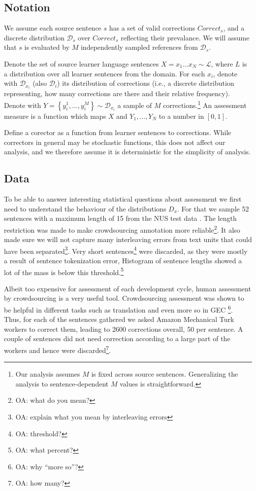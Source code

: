 \documentclass[english]{article}
\newcommand{\oa}[1]{\footnote{\color{red}OA: #1}}
\begin{document}
\subsection{Notation}

We assume each source sentence $s$ has a set of valid corrections $Correct_s$,
and a discrete distribution $\mathcal{D}_s$ over $Correct_s$ reflecting their prevalance.
We will assume that $s$ is evaluated by
$M$ independently sampled references from $\mathcal{D}_s$.

Denote the set of source learner language sentences $X=x_{1}\ldots x_N \sim \mathcal{L}$, where
$L$ is a distribution over all learner sentences from the domain. For each $x_i$, denote
with $\mathcal{D}_{x_i}$ (also $\mathcal{D}_i$) its distribution of corrections (i.e., a discrete
distribution representing, how many corrections are there and their relative frequency).
Denote with $Y = \left\{y_{i}^{1},\ldots, y_{i}^{M}\right\} \sim \mathcal{D}_{x_i}$
a sample of $M$ corrections.\footnote{Our analysis assumes $M$ is fixed across source sentences.
  Generalizing the analysis to sentence-dependent $M$ values is straightforward.}
An assessment measure is a function which maps $X$ and $Y_1,\ldots,Y_N$ to
a number in $[0,1]$.

Define a corector as a function from learner sentences to corrections. While correctors
in general may be stochastic functions, this does not affect our analysis, and we therefore
assume it is deterministic for the simplicity of analysis.


\subsection{Data}

To be able to answer interesting statistical questions about assessment we first
need to understand the behaviour of the distributions $D_x$. For that we sample
52 sentences with a maximum length of 15 from the NUS test data
\cite{dahlmeier2013building}. The length restriction was made to make crowdsourcing
annotation more reliable\oa{what do you mean?}.
It also made sure we will not capture many interleaving
errors from text units that could have been separated\oa{explain what you mean by
  interleaving errors}.
Very short sentences\oa{threshold?} were discarded, as they were
mostly a result of sentence tokenization error,
Histogram of sentence lengths showed a lot of the mass is below this threshold.\oa{what percent?}

Albeit too expensive for assessment of each development cycle, human assessment
by crowdsourcing is a very useful tool. Crowdsourcing assessment was shown to
be helpful in different tasks such as translation
\cite{zaidan2011crowdsourcing,post2012constructing,graham2015improved}
and even more so in GEC \cite{madnani2011they}\oa{why ``more so''?}.
Thus, for each of the sentences gathered we asked Amazon Mechanical Turk workers to correct them, leading to 2600 corrections overall,
50 per sentence. A couple of sentences did not need correction according to a large part of the workers and hence were discarded\oa{how many?}.
\end{document}

